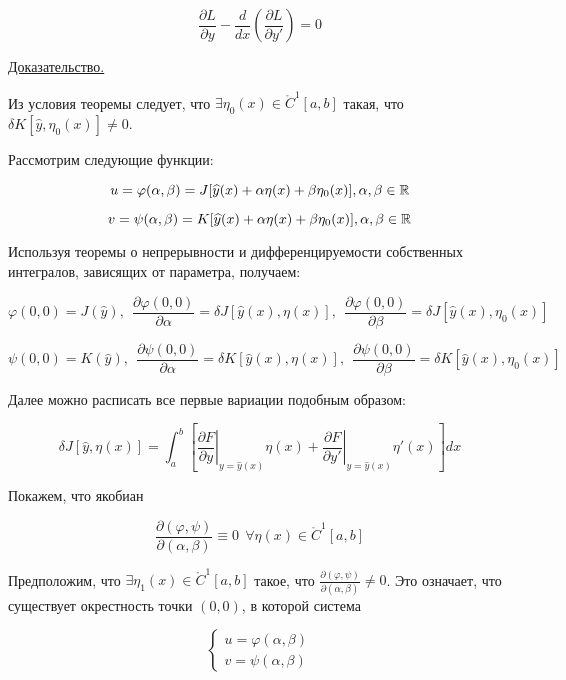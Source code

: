 \begin{equation}\label{euler_eq_isoper}
\frac{\partial L}{\partial y} - \frac{d}{dx} \left(
\frac{\partial L}{\partial y'} \right) = 0
\end{equation}

\underline{Доказательство.}

Из условия теоремы следует, что $\exists \eta_0(x) \in \mathring{C}^1 [a, b]$
такая, что $\delta K [ \widehat{y}, \eta_0(x) ] \neq 0$.

Рассмотрим следующие функции:

$$
u = \varphi(\alpha, \beta) = 
J [\widehat{y}(x) + \alpha \eta(x) + \beta \eta_0(x)],
\alpha, \beta \in \mathbb{R}
$$

$$
v = \psi(\alpha, \beta) = 
K [\widehat{y}(x) + \alpha \eta(x) + \beta \eta_0(x)],
\alpha, \beta \in \mathbb{R}
$$

Используя теоремы о непрерывности и дифференцируемости собственных
интегралов, зависящих от параметра, получаем:

$$
\varphi(0, 0) = J(\widehat{y}), \ \ 
\frac{\partial \varphi (0, 0)}{\partial \alpha} = 
\delta J[ \widehat{y}(x), \eta(x)], \ \ 
\frac{\partial \varphi (0, 0)}{\partial \beta} = 
\delta J[ \widehat{y}(x), \eta_0(x)]
$$

$$
\psi(0, 0) = K(\widehat{y}), \ \ 
\frac{\partial \psi (0, 0)}{\partial \alpha} = 
\delta K[ \widehat{y}(x), \eta(x)], \ \ 
\frac{\partial \psi (0, 0)}{\partial \beta} = 
\delta K[ \widehat{y}(x), \eta_0(x)]
$$

Далее можно расписать все первые вариации подобным образом:

$$
\delta J [\widehat{y}, \eta(x)] = 
\int_a^b \left[ 
\left. \frac{\partial F}{\partial y} \right|_{y = \widehat{y}(x)} \eta(x) +
\left. \frac{\partial F}{\partial y'} \right|_{y = \widehat{y}(x)} \eta'(x)
\right] dx
$$

Покажем, что якобиан

$$
\frac{\partial (\varphi, \psi)}{\partial (\alpha, \beta)} \equiv 0
\ \ \forall \eta(x) \in \mathring{C}^1 [a, b]
$$

Предположим, что $\exists \eta_1(x) \in \mathring{C}^1 [a, b]$ такое, что
$\frac{\partial (\varphi, \psi)}{\partial (\alpha, \beta)} \neq 0$.
Это означает, что существует окрестность точки $(0, 0)$,
в которой система

\begin{equation*}
\begin{cases}
u = \varphi(\alpha, \beta) \\
v = \psi(\alpha, \beta)
\end{cases}
\end{equation*}

